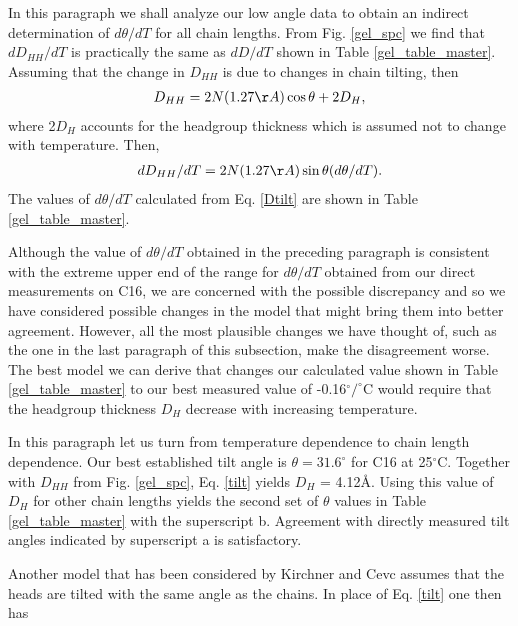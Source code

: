 In this paragraph we shall analyze our low angle data to obtain an indirect
determination of $d{\theta}/dT$ for all chain lengths.  From 
Fig. \ref{gel_spc} we find that
$dD_{HH}/dT$ is practically the same as $dD/dT$ shown in 
Table \ref{gel_table_master}.
Assuming that the change in $D_{HH}$ is due to changes in chain tilting, then
\begin{eqnarray}
\label{tilt}
D_{HH} = 2N(1.27\AA) \cos{\theta} + 2D_{H},
\end{eqnarray}
where 2$D_{H}$ accounts for the headgroup thickness which is assumed not to 
change with temperature.  Then,
\begin{eqnarray}
\label{Dtilt}
dD_{HH}/dT = 2N(1.27\AA) \sin{\theta}(d{\theta}/dT) .
\end{eqnarray}
The values of $d{\theta}/dT$ calculated from Eq. \ref{Dtilt} are shown
in Table \ref{gel_table_master}.  

Although the value of $d{\theta}/dT$ obtained in the preceding paragraph
is consistent with the extreme upper end of the range for $d{\theta}/dT$ 
obtained from our direct measurements on C16,
we are concerned with the possible discrepancy
and so we have considered possible changes in the model that might
bring them into better agreement.  However, all the most plausible changes
we have thought of, such as the one in the last paragraph of this
subsection, make the 
disagreement worse.  The best model we can derive that changes our calculated 
value shown in Table \ref{gel_table_master} to
our best measured value of -0.16$^{\circ}/^{\circ}$C would require that 
the headgroup
thickness $D_{H}$ decrease with increasing temperature.

In this paragraph let us turn from temperature dependence to chain length
dependence.  Our best established tilt angle is $\theta = 31.6^{\circ}$ for
C16 at 25$^{\circ}$C.  Together with $D_{HH}$ from Fig. \ref{gel_spc}, 
Eq. \ref{tilt} yields $D_{H}$ = 4.12\AA.  Using this value of $D_{H}$ for 
other chain lengths
yields the second set of $\theta$ values in Table \ref{gel_table_master} 
with the superscript b.
Agreement with directly measured tilt angles indicated by superscript
a is satisfactory.  

Another model that has been considered by Kirchner and Cevc \cite{Kir94}
assumes that the heads are tilted with the same angle as the chains.  
In place of Eq. \ref{tilt} one then has


